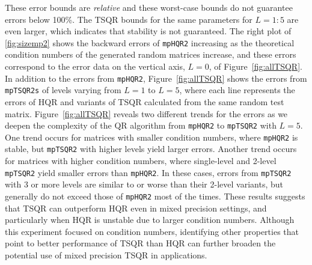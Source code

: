 \documentclass[review,onefignum,onetabnum]{siamart190516}
\begin{document}
These error bounds are \emph{relative} and these worst-case bounds do not guarantee errors below 100\%.
The TSQR bounds for the same parameters for $L=1:5$ are even larger, which indicates that stability is not guaranteed. 
The right plot of \cref{fig:sizemp2} shows the backward errors of {\tt mpHQR2} increasing as the theoretical condition numbers of the generated random matrices increase, and these errors correspond to the error data on the vertical axis, $L=0$, of Figure~\ref{fig:allTSQR}.
In addition to the errors from {\tt mpHQR2}, Figure~\ref{fig:allTSQR} shows the errors from {\tt mpTSQR2s} of levels varying from $L=1$ to $L=5$, where each line represents the errors of HQR and variants of TSQR calculated from the same random test matrix.
Figure~\ref{fig:allTSQR} reveals two different trends for the errors as we deepen the complexity of the QR algorithm from {\tt mpHQR2} to {\tt mpTSQR2} with $L=5$. 
One trend occurs for matrices with smaller condition numbers, where {\tt mpHQR2} is stable, but {\tt mpTSQR2} with higher levels yield larger errors. 
Another trend occurs for matrices with higher condition numbers, where single-level and 2-level {\tt mpTSQR2} yield smaller errors than {\tt mpHQR2}. 
In these cases, errors from {\tt mpTSQR2} with 3 or more levels are similar to or worse than their 2-level variants, but generally do not exceed those of {\tt mpHQR2} most of the times.
These results suggests that TSQR can outperform HQR even in mixed precision settings, and particularly when HQR is unstable due to larger condition numbers.
Although this experiment focused on condition numbers, identifying other properties that point to better performance of TSQR than HQR can further broaden the potential use of mixed precision TSQR in applications.\par
%
\end{document}
